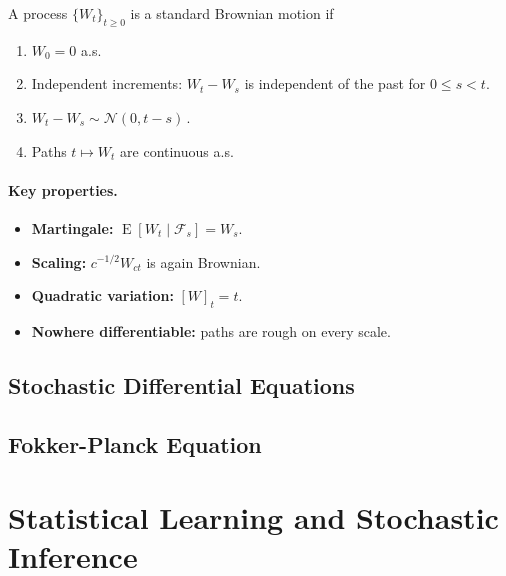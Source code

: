 \documentclass[10pt, headings=standardclasses, parskip=half, twoside]{scrartcl}
\renewcommand{\emph}[1]{\textcolor{mypurple}{#1}}
\newcommand{\Exp}{\operatorname{E}}
\begin{document}
\begin{definition}\label{def:BM}
A process $\{W_t\}_{t\ge 0}$ is a \emph{standard Brownian motion} if
\begin{enumerate}[label=\arabic*.,leftmargin=*]
  \item $W_0=0$ a.s.
  \item\label{item:indep} \emph{Independent increments:} $W_{t}-W_{s}$ is independent of the past for $0\le s<t$.
  \item\label{item:normal} $W_{t}-W_{s}\sim\mathcal N(0,t-s)\,$.
  \item\label{item:cont} Paths $t\mapsto W_t$ are continuous a.s.
\end{enumerate}
\end{definition}

\paragraph{Key properties.}
\begin{itemize}[leftmargin=1em]
  \item \textbf{Martingale:} $\Exp[W_t\mid \mathcal F_s]=W_s$.
  \item \textbf{Scaling:} $c^{-1/2}W_{ct}$ is again Brownian.
  \item \textbf{Quadratic variation:} $[W]_t = t$.
  \item \textbf{Nowhere differentiable:} paths are rough on every scale.
\end{itemize}







\subsection{Stochastic Differential Equations}\label{subsec:sde}


\subsection{Fokker-Planck Equation}\label{subsec:fp}






\section{Statistical Learning and Stochastic Inference}
\label{sec:statistical_learning}
\end{document}
